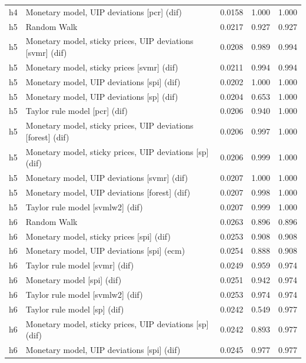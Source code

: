 \begin{ThreePartTable}
\begin{longtable}[t]{cp{5.5cm}ccc}
h4 & \raggedright Monetary model, UIP deviations [pcr] (dif) & 0.0158 & 1.000 & 1.000\\
\addlinespace
h5 & \raggedright Random Walk & 0.0217 & 0.927 & 0.927\\
h5 & \raggedright Monetary model, sticky prices, UIP deviations [svmr] (dif) & 0.0208 & 0.989 & 0.994\\
h5 & \raggedright Monetary model, sticky prices [svmr] (dif) & 0.0211 & 0.994 & 0.994\\
h5 & \raggedright Monetary model, UIP deviations [spi] (dif) & 0.0202 & 1.000 & 1.000\\
h5 & \raggedright Monetary model, UIP deviations [sp] (dif) & 0.0204 & 0.653 & 1.000\\
h5 & \raggedright Taylor rule model [pcr] (dif) & 0.0206 & 0.940 & 1.000\\
h5 & \raggedright Monetary model, sticky prices, UIP deviations [forest] (dif) & 0.0206 & 0.997 & 1.000\\
h5 & \raggedright Monetary model, sticky prices, UIP deviations [sp] (dif) & 0.0206 & 0.999 & 1.000\\
h5 & \raggedright Monetary model, UIP deviations [svmr] (dif) & 0.0207 & 1.000 & 1.000\\
h5 & \raggedright Monetary model, UIP deviations [forest] (dif) & 0.0207 & 0.998 & 1.000\\
h5 & \raggedright Taylor rule model [svmlw2] (dif) & 0.0207 & 0.999 & 1.000\\
\addlinespace
h6 & \raggedright Random Walk & 0.0263 & 0.896 & 0.896\\
h6 & \raggedright Monetary model, sticky prices [spi] (dif) & 0.0253 & 0.908 & 0.908\\
h6 & \raggedright Monetary model, UIP deviations [spi] (ecm) & 0.0254 & 0.888 & 0.908\\
h6 & \raggedright Taylor rule model [svmr] (dif) & 0.0249 & 0.959 & 0.974\\
h6 & \raggedright Monetary model [spi] (dif) & 0.0251 & 0.942 & 0.974\\
h6 & \raggedright Taylor rule model [svmlw2] (dif) & 0.0253 & 0.974 & 0.974\\
h6 & \raggedright Taylor rule model [sp] (dif) & 0.0242 & 0.549 & 0.977\\
h6 & \raggedright Monetary model, sticky prices, UIP deviations [sp] (dif) & 0.0242 & 0.893 & 0.977\\
h6 & \raggedright Monetary model, UIP deviations [spi] (dif) & 0.0245 & 0.977 & 0.977\\

\end{longtable}
\end{ThreePartTable}
